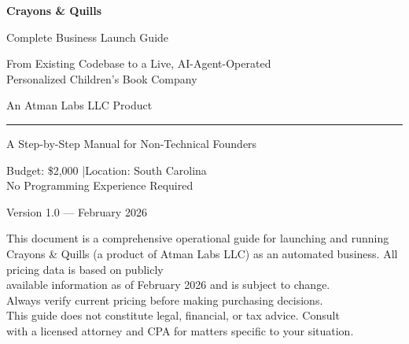 \documentclass[12pt, letterpaper, oneside]{book}
\begin{document}
\begin{titlepage}
\begin{center}
\vspace*{1.5in}

{\fontsize{42}{50}\selectfont\bfseries\textcolor{primary}{Crayons \& Quills}}

\vspace{0.3in}
{\fontsize{18}{22}\selectfont\textcolor{darkbg}{Complete Business Launch Guide}}

\vspace{0.5in}
{\large\textcolor{midgray}{From Existing Codebase to a Live, AI-Agent-Operated\\
Personalized Children's Book Company}}

\vspace{0.2in}
{\normalsize\textcolor{midgray}{An Atman Labs LLC Product}}

\vspace{0.4in}
\rule{3in}{0.5pt}

\vspace{0.4in}
{\large\textcolor{darkbg}{A Step-by-Step Manual for Non-Technical Founders}}

\vspace{0.3in}
{\normalsize\textcolor{midgray}{Budget: \$2{,}000 \quad|\quad Location: South Carolina\\[6pt]
No Programming Experience Required}}

\vfill
{\small\textcolor{midgray}{Version 1.0 --- February 2026}}
\end{center}
\end{titlepage}

\thispagestyle{empty}
\vspace*{\fill}
\noindent\textcolor{midgray}{\small
This document is a comprehensive operational guide for launching and running\\
Crayons \& Quills (a product of Atman Labs LLC) as an automated business. All pricing data is based on publicly\\
available information as of February 2026 and is subject to change.\\[12pt]
Always verify current pricing before making purchasing decisions.\\[12pt]
This guide does not constitute legal, financial, or tax advice. Consult\\
with a licensed attorney and CPA for matters specific to your situation.}
\newpage
\end{document}
